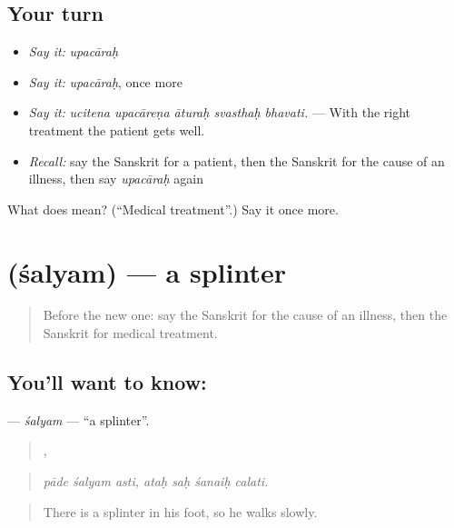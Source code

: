 \subsection*{Your turn}
\begin{itemize}
\raggedright
  \item \emph{Say it:} \emph{upacāraḥ}
  \item \emph{Say it:} \emph{upacāraḥ}, once more
  \item \emph{Say it:} \emph{ucitena upacāreṇa āturaḥ svasthaḥ bhavati.} — With the right treatment the patient gets well.
  \item \emph{Recall:} say the Sanskrit for a patient, then the Sanskrit for the cause of an illness, then say \emph{upacāraḥ} again
\end{itemize}

\begin{tcolorbox}[breakable,colback=teal!4,colframe=teal!35!black,title={Before you move on}]
What does  mean? (\textquotedblleft{}Medical treatment\textquotedblright{}.) Say it once more.
\end{tcolorbox}
\section[\texorpdfstring{\sk{शल्यम्} (śalyam)}{शल्यम् (śalyam)}]{ (śalyam) — a splinter}

\label{lesson:SA-C482-salyam}



\begin{quote}
Before the new one: say the Sanskrit for the cause of an illness, then the Sanskrit for medical treatment.
\end{quote}

\subsection*{You'll want to know: }
\textbf{} — \emph{śalyam} — \textquotedblleft{}a splinter\textquotedblright{}.

\begin{quote}
  ,    
\end{quote}

\begin{quote}
\emph{pāde śalyam asti, ataḥ saḥ śanaiḥ calati.}
\end{quote}

\begin{quote}
There is a splinter in his foot, so he walks slowly.
\end{quote}

